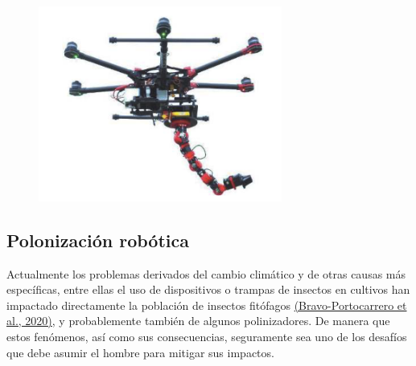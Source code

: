 \documentclass{article}
\begin{document}
\begin{figure}[h]
\includegraphics[width=8cm]{pictures/arm_drone.png}
\centering
\end{figure}



\newpage
\subsection{Polonización robótica}


Actualmente los problemas derivados del cambio climático y de otras causas más específicas, entre ellas el uso de dispositivos o trampas de insectos en cultivos han impactado directamente la población de insectos fitófagos \href{http://www.scielo.org.pe/scielo.php?pid=S2077-99172020000100061&script=sci_abstract}{(Bravo-Portocarrero et al., 2020)}, y probablemente también de algunos polinizadores. De manera que estos fenómenos, así como sus consecuencias, seguramente sea uno de los desafíos que debe asumir el hombre para mitigar sus impactos.\\
\end{document}
